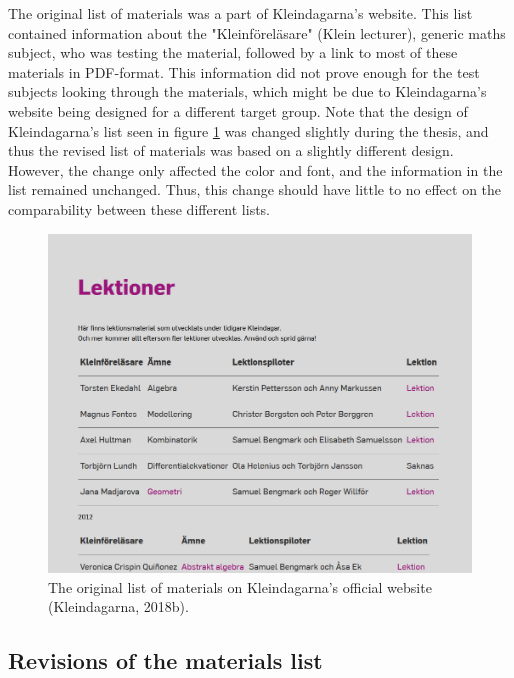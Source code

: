 The original list of materials was a part of Kleindagarna's website. This list contained information about the "Kleinföreläsare" (Klein lecturer), generic maths subject, who was testing the material, followed by a link to most of these materials in PDF-format. This information did not prove enough for the test subjects looking through the materials, which might be due to Kleindagarna's website being designed for a different target group. Note that the design of Kleindagarna's list seen in figure \ref{fig:originmaterialslist} was changed slightly during the thesis, and thus the revised list of materials was based on a slightly different design. However, the change only affected the color and font, and the information in the list remained unchanged. Thus, this change should have little to no effect on the comparability between these different lists.

\begin{figure}[H]
\centering
\includegraphics[width=\linewidth]{figure/screenshot_materiallista_kleindagarna.png}
  \caption{The original list of materials on Kleindagarna's official website (Kleindagarna, 2018b).}
\label{fig:originmaterialslist}
\end{figure}

\subsection{Revisions of the materials list}

